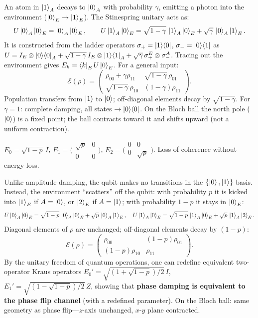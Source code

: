 \documentclass[10pt,a4paper]{article}
\begin{document}
An atom in $\ket{1}_A$ decays to $\ket{0}_A$ with probability $\gamma$, emitting a photon into the environment ($\ket{0}_E\to\ket{1}_E$). The Stinespring unitary acts as:
\[
U\ket{0}_A\ket{0}_E=\ket{0}_A\ket{0}_E,\qquad U\ket{1}_A\ket{0}_E=\sqrt{1-\gamma}\,\ket{1}_A\ket{0}_E+\sqrt{\gamma}\,\ket{0}_A\ket{1}_E.
\]
It is constructed from the ladder operators $\sigma_+=\ket{1}\!\bra{0}$, $\sigma_-=\ket{0}\!\bra{1}$ as $U=I_E\otimes\ket{0}\!\bra{0}_A+\sqrt{1-\gamma}\,I_E\otimes\ket{1}\!\bra{1}_A+\sqrt{\gamma}\,\sigma_+^E\otimes\sigma_-^A$. Tracing out the environment gives $E_k=\bra{k}_E U\ket{0}_E$. For a general input:
\[
\mathcal{E}(\rho)=\begin{pmatrix}\rho_{00}+\gamma\rho_{11}&\sqrt{1-\gamma}\,\rho_{01}\\\sqrt{1-\gamma}\,\rho_{10}&(1-\gamma)\rho_{11}\end{pmatrix}.
\]
Population transfers from $\ket{1}$ to $\ket{0}$; off-diagonal elements decay by $\sqrt{1-\gamma}$. For $\gamma=1$: complete damping, all states $\to\ket{0}\!\bra{0}$. On the Bloch ball the north pole ($\ket{0}$) is a fixed point; the ball contracts toward it and shifts upward (not a uniform contraction).

\begin{tcolorbox}[defstyle, title={Definition: Phase Damping Channel}]
$E_0=\sqrt{1-p}\,I$, $E_1=\bigl(\begin{smallmatrix}\sqrt{p}&0\\0&0\end{smallmatrix}\bigr)$, $E_2=\bigl(\begin{smallmatrix}0&0\\0&\sqrt{p}\end{smallmatrix}\bigr)$. Loss of coherence without energy loss.
\end{tcolorbox}

Unlike amplitude damping, the qubit makes no transitions in the $\{\ket{0},\ket{1}\}$ basis. Instead, the environment ``scatters'' off the qubit: with probability $p$ it is kicked into $\ket{1}_E$ if $A=\ket{0}$, or $\ket{2}_E$ if $A=\ket{1}$; with probability $1-p$ it stays in $\ket{0}_E$:
\[
U\ket{0}_A\ket{0}_E=\sqrt{1-p}\,\ket{0}_A\ket{0}_E+\sqrt{p}\,\ket{0}_A\ket{1}_E,\quad U\ket{1}_A\ket{0}_E=\sqrt{1-p}\,\ket{1}_A\ket{0}_E+\sqrt{p}\,\ket{1}_A\ket{2}_E.
\]
Diagonal elements of $\rho$ are unchanged; off-diagonal elements decay by $(1-p)$:
\[
\mathcal{E}(\rho)=\begin{pmatrix}\rho_{00}&(1-p)\rho_{01}\\(1-p)\rho_{10}&\rho_{11}\end{pmatrix}.
\]
By the unitary freedom of quantum operations, one can redefine equivalent two-operator Kraus operators $E_0'=\sqrt{(1+\sqrt{1-p})/2}\,I$, $E_1'=\sqrt{(1-\sqrt{1-p})/2}\,Z$, showing that \textbf{phase damping is equivalent to the phase flip channel} (with a redefined parameter). On the Bloch ball: same geometry as phase flip---$z$-axis unchanged, $x$-$y$ plane contracted.
\end{document}
